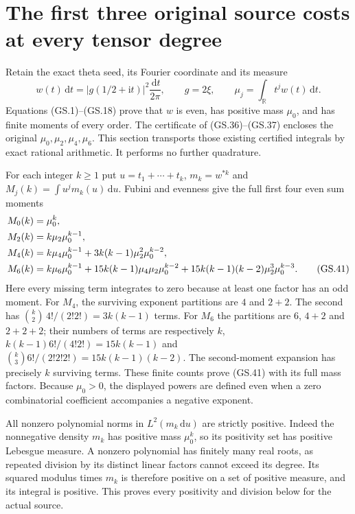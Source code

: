 \begingroup
\def\ii{\mathrm i}
\def\dd{\,\mathrm d}
\section{The first three original source costs at every tensor degree}

Retain the exact theta seed, its Fourier coordinate and its measure
\[
 w(t)\dd t=|g(1/2+\ii t)|^2\frac{\dd t}{2\pi},\qquad
 g=2\xi,\qquad \mu_j=\int_{\mathbb R}t^j w(t)\dd t.
\]
Equations (GS.1)--(GS.18) prove that $w$ is even, has positive mass
$\mu_0$, and has finite moments of every order. The certificate of
(GS.36)--(GS.37) encloses the original $\mu_0,\mu_2,\mu_4,\mu_6$.
This section transports those existing certified integrals by exact
rational arithmetic. It performs no further quadrature.

For each integer $k\ge1$ put $u=t_1+\cdots+t_k$,
$m_k=w^{*k}$ and $M_j(k)=\int u^j m_k(u)\dd u$.
Fubini and evenness give the full first four even sum moments
\begin{align}
 M_0(k)&=\mu_0^k,\notag\\
 M_2(k)&=k\mu_2\mu_0^{k-1},\notag\\
 M_4(k)&=k\mu_4\mu_0^{k-1}
          +3k(k-1)\mu_2^2\mu_0^{k-2},\notag\\
 M_6(k)&=k\mu_6\mu_0^{k-1}
          +15k(k-1)\mu_4\mu_2\mu_0^{k-2}
          +15k(k-1)(k-2)\mu_2^3\mu_0^{k-3}.
 \tag{GS.41}
\end{align}
Here every missing term integrates to zero because at least one
factor has an odd moment. For $M_4$, the surviving exponent
partitions are $4$ and $2+2$. The second has
$\binom{k}{2}\,4!/(2!2!)=3k(k-1)$ terms. For $M_6$ the
partitions are $6$, $4+2$ and $2+2+2$; their numbers of terms
are respectively $k$, $k(k-1)6!/(4!2!)=15k(k-1)$ and
$\binom{k}{3}6!/(2!2!2!)=15k(k-1)(k-2)$.
The second-moment expansion has precisely $k$ surviving terms.
These finite counts prove (GS.41) with its full mass factors.
Because $\mu_0>0$, the displayed powers are defined even when
a zero combinatorial coefficient accompanies a negative exponent.

All nonzero polynomial norms in $L^2(m_k\dd u)$ are strictly
positive. Indeed the nonnegative density $m_k$ has positive mass
$\mu_0^k$, so its positivity set has positive Lebesgue measure.
A nonzero polynomial has finitely many real roots, as repeated
division by its distinct linear factors cannot exceed its degree.
Its squared modulus times $m_k$ is therefore positive on a set of
positive measure, and its integral is positive. This proves every
positivity and division below for the actual source.

